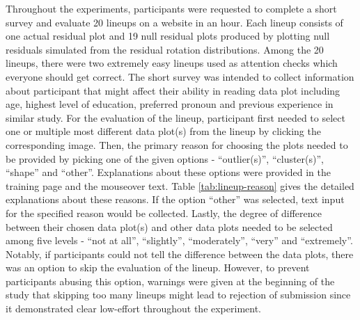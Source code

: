 \documentclass{monashthesis}
\theoremstyle{definition}
\theoremstyle{definition}
\theoremstyle{definition}
\theoremstyle{definition}
\theoremstyle{remark}
\begin{document}
Throughout the experiments, participants were requested to complete a short survey and evaluate 20 lineups on a website in an hour. Each lineup consists of one actual residual plot and 19 null residual plots produced by plotting null residuals simulated from the residual rotation distributions. Among the 20 lineups, there were two extremely easy lineups used as attention checks which everyone should get correct. The short survey was intended to collect information about participant that might affect their ability in reading data plot including age, highest level of education, preferred pronoun and previous experience in similar study. For the evaluation of the lineup, participant first needed to select one or multiple most different data plot(s) from the lineup by clicking the corresponding image. Then, the primary reason for choosing the plots needed to be provided by picking one of the given options - ``outlier(s)'', ``cluster(s)'', ``shape'' and ``other''. Explanations about these options were provided in the training page and the mouseover text. Table \ref{tab:lineup-reason} gives the detailed explanations about these reasons. If the option ``other'' was selected, text input for the specified reason would be collected. Lastly, the degree of difference between their chosen data plot(s) and other data plots needed to be selected among five levels - ``not at all'', ``slightly'', ``moderately'', ``very'' and ``extremely''. Notably, if participants could not tell the difference between the data plots, there was an option to skip the evaluation of the lineup. However, to prevent participants abusing this option, warnings were given at the beginning of the study that skipping too many lineups might lead to rejection of submission since it demonstrated clear low-effort throughout the experiment.

\begin{table}

\caption{\label{tab:lineup-reason}Explanations about reasons for choosing data plots from a lineup}
\centering
{}
\end{table}
\end{document}
